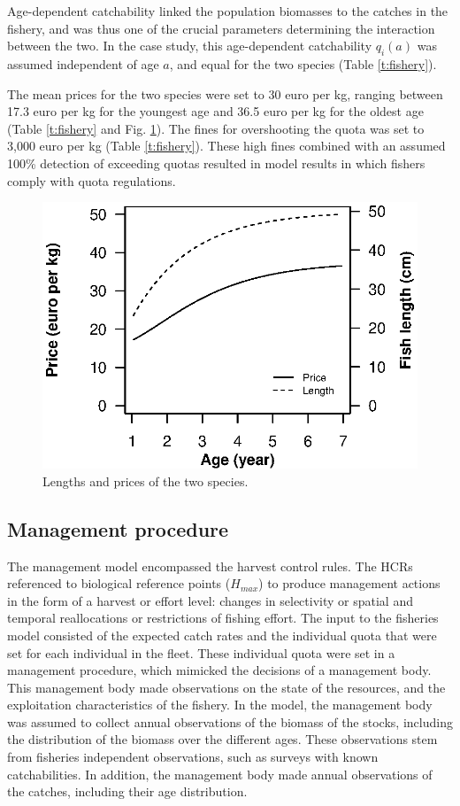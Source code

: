 \documentclass[12pt,oneline,a4paper,numbib]{ouparticle}
\numberwithin{equation}{subsection} %
\begin{document}
Age-dependent catchability linked the population biomasses to the catches in the fishery, and was thus one of the crucial parameters determining the interaction between the two. In the case study, this age-dependent catchability $q_i (a)$ was assumed independent of age $a$, and equal for the two species (Table \ref{t:fishery}).

The mean prices for the two species were set to 30 euro per kg, ranging between 17.3 euro per kg for the youngest age and 36.5  euro per kg for the oldest age (Table \ref{t:fishery} and Fig. \ref{f:prices}). The fines for overshooting the quota was set  to 3,000 euro per kg (Table \ref{t:fishery}). These high fines combined with an assumed 100\% detection of exceeding quotas resulted in model results in which fishers comply with quota regulations.

\begin{figure}[!ht]
\centering
\includegraphics[width=.5\textwidth]{Figures/Prices.eps} 
\caption{Lengths and prices of the two species.}
\label{f:prices}
\end{figure}

\subsection{Management procedure}

The management model encompassed the harvest control rules. The HCRs referenced to biological reference points ($H_{max}$) to produce management actions in the form of a harvest or effort level: changes in selectivity or spatial and temporal reallocations or restrictions of fishing effort. The input to the fisheries model consisted of the expected catch rates and the individual quota that were set for each individual in the fleet. These individual quota were set in a management procedure, which mimicked the decisions of a management body. This management body made observations on the state of the resources, and the exploitation characteristics of the fishery. In the model, the management body was assumed to collect annual observations of the biomass of the stocks, including the distribution of the biomass over the different ages. These observations stem from fisheries independent observations, such as surveys with known catchabilities. In addition, the management body made annual observations of the catches, including their age distribution. 
\end{document}
